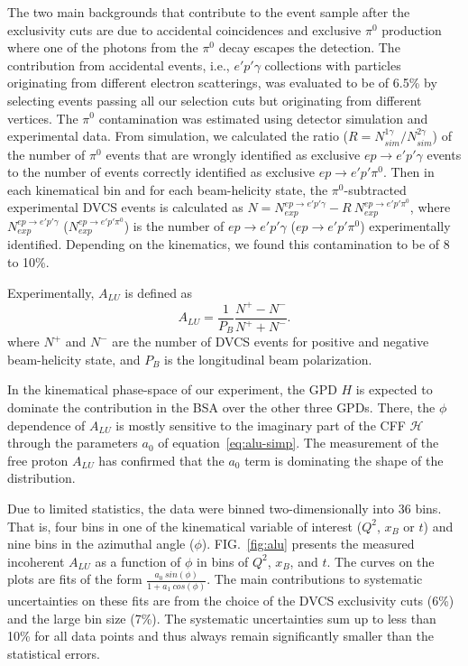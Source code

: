 \documentclass[twocolumn,nofootinbib,showpacs,prl,superscriptaddress,secnumarabic,amssymb,nobibnotes,aps,floatfix]{revtex4}
\begin{document}
The two main backgrounds that contribute to the event sample after the exclusivity cuts are  
due to accidental coincidences and exclusive $\pi^0$ production where one of the photons 
from the $\pi^0$ decay escapes the detection. The contribution from accidental 
events, i.e., $e'p'\gamma$ collections 
with particles originating from different electron scatterings,
was evaluated to be of 6.5\% by selecting events passing all our selection cuts but originating from 
different vertices. The $\pi^0$ contamination was estimated using detector simulation and experimental 
data. From simulation, we calculated the ratio ($R = N^{1\gamma}_{sim}/N^{2\gamma}_{sim}$) 
of the number of $\pi^0$ 
events that are wrongly identified as exclusive $ep\rightarrow e'p'\gamma$ events to the 
number of events correctly identified as exclusive $ep\rightarrow e'p'\pi^0$. Then 
in each kinematical bin and for 
each beam-helicity state, the $\pi^0$-subtracted experimental DVCS events is 
calculated as $N = N^{ep\rightarrow e'p'\gamma}_{exp}- R~N^{ep\rightarrow 
e'p'\pi^0}_{exp}$, where $N^{ep\rightarrow e'p'\gamma}_{exp}$ ($N^{ep\rightarrow e'p'\pi^0}_{exp}$) is the 
number of $ep\rightarrow e'p'\gamma$ ($ep\rightarrow e'p'\pi^0$) experimentally identified. Depending on the 
kinematics, we found this contamination to be of 8 to 10\%. 


Experimentally, $A_{LU}$ is defined as
\begin{equation}
A_{LU} = \frac{1}{P_{B}} \frac{N^{+} - N^{-}}{N^{+} + N^{-} }.
\end{equation}
where $N^{+}$ and $N^{-}$ are the number of DVCS events for positive and negative 
beam-helicity state, and $P_{B}$ is the longitudinal beam polarization.  

In the kinematical phase-space of our experiment, the GPD $H$ is
expected to dominate the 
contribution in the BSA over the other three GPDs. There, 
the $\phi$ dependence of $A_{LU}$ is mostly sensitive to the  
imaginary part of the CFF $\mathcal{H}$ through the parameters $a_0$ of 
equation~\ref{eq:alu-simp}. The measurement of the free proton 
$A_{LU}$ \cite{Girod:2007aa} has confirmed that the $a_0$ term is 
dominating the shape of the distribution. 

Due to limited statistics, the data were binned two-dimensionally into 36 bins.  
That is, four bins in one of the kinematical variable of interest ($Q^{2}$, 
$x_{B}$ or $t$) and nine bins in the azimuthal angle ($\phi$).  
FIG.~\ref{fig:alu} presents the measured incoherent $A_{LU}$ as a function of 
$\phi$ in bins of $Q^{2}$, $x_{B}$, and $t$. The curves on the plots are fits 
of the form $\frac{a_{0}~sin(\phi)}{1+ a_{1}~cos(\phi)}$. The main contributions 
to systematic uncertainties on these fits are from the choice of the DVCS 
exclusivity cuts (6\%) and the large bin size (7\%). The systematic uncertainties
sum up to less than 10\% for all data points and thus always remain significantly 
smaller than the statistical errors.
\end{document}
